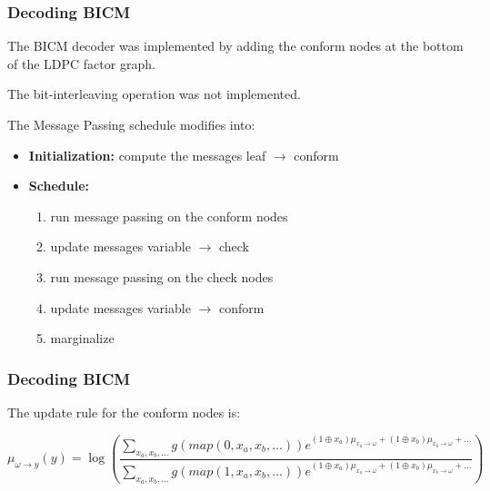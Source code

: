 \documentclass[]{beamer}
\begin{document}
\begin{frame}
\transwipe[direction=0]
\frametitle{Decoding BICM}
The BICM decoder was implemented by adding the conform nodes at the bottom of the LDPC factor graph. 

The bit-interleaving operation was not implemented.

\vspace{0.5cm}

The Message Passing schedule modifies into:
\begin{itemize}
	\item \textbf{Initialization:} compute the messages leaf $\rightarrow$ conform
	\item \textbf{Schedule:}
	\begin{enumerate}
		\item run message passing on the conform nodes
		\item update messages variable $\rightarrow$ check
		\item run message passing on the check nodes
		\item update messages variable $\rightarrow$ conform
		\item marginalize
	\end{enumerate}
\end{itemize}
\end{frame}

\begin{frame}
\transwipe[direction=0]
\frametitle{Decoding BICM}
The update rule for the conform nodes is:

\begin{equation*}
\mu_{\omega \rightarrow y} (y) = \log \left ( \frac{\sum\limits_{x_a, x_b, \dots} g(map(0,x_a,x_b,\dots)) e^{(1\oplus x_a)\mu_{x_a \rightarrow \omega}+(1\oplus x_b)\mu_{x_b \rightarrow \omega}+\dots}}{\sum\limits_{x_a, x_b, \dots} g(map(1,x_a,x_b,\dots)) e^{(1\oplus x_a)\mu_{x_a \rightarrow \omega}+(1\oplus x_b)\mu_{x_b \rightarrow \omega}+\dots}} \right)
\end{equation*}

\begin{center}
\end{center}


\end{frame}
\end{document}
